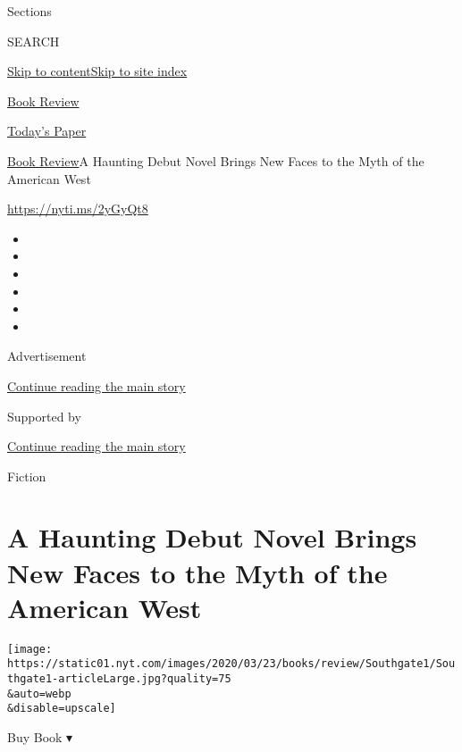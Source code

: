 Sections

SEARCH

\protect\hyperlink{site-content}{Skip to
content}\protect\hyperlink{site-index}{Skip to site index}

\href{https://www.nytimes.com/section/books/review}{Book Review}

\href{https://myaccount.nytimes.com/auth/login?response_type=cookie\&client_id=vi}{}

\href{https://www.nytimes.com/section/todayspaper}{Today's Paper}

\href{/section/books/review}{Book Review}\textbar{}A Haunting Debut
Novel Brings New Faces to the Myth of the American West

\url{https://nyti.ms/2yGyQt8}

\begin{itemize}
\item
\item
\item
\item
\item
\item
\end{itemize}

Advertisement

\protect\hyperlink{after-top}{Continue reading the main story}

Supported by

\protect\hyperlink{after-sponsor}{Continue reading the main story}

Fiction

\hypertarget{a-haunting-debut-novel-brings-new-faces-to-the-myth-of-the-american-west}{%
\section{A Haunting Debut Novel Brings New Faces to the Myth of the
American
West}\label{a-haunting-debut-novel-brings-new-faces-to-the-myth-of-the-american-west}}

\texttt{[image: https://static01.nyt.com/images/2020/03/23/books/review/Southgate1/Southgate1-articleLarge.jpg?quality=75\\\&auto=webp\\\&disable=upscale]}

Buy Book ▾

